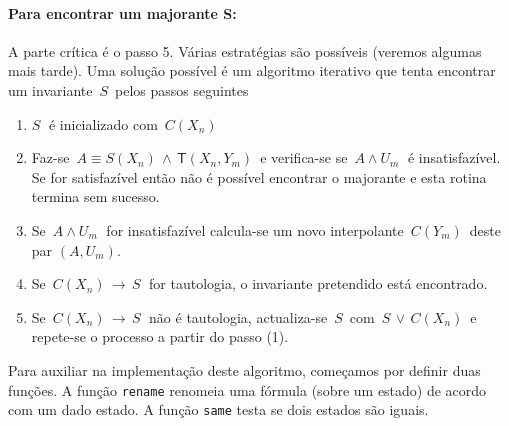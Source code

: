 \documentclass[11pt]{article}
\providecommand{\tightlist}{%
      \setlength{\itemsep}{0pt}\setlength{\parskip}{0pt}}
\begin{document}
\hypertarget{para-encontrar-um-majorante-s}{%
\paragraph{\texorpdfstring{Para encontrar um majorante S:}{Para encontrar um majorante S:}}\label{para-encontrar-um-majorante-s}}

A parte crítica é o passo 5. Várias estratégias são possíveis (veremos
algumas mais tarde). Uma solução possível é um algoritmo iterativo que
tenta encontrar um invariante \(\,S\,\) pelos passos seguintes

\begin{enumerate}
\def\labelenumi{\arabic{enumi}.}
\tightlist
\item
  \(S\;\) é inicializado com \(\,C(X_n)\)
\item
  Faz-se \(\,A \equiv S(X_n)\,\land\,\mathsf{T}(X_n,Y_m)\,\) e
  verifica-se se \(\,A\land U_m\;\) é insatisfazível. Se for
  satisfazível então não é possível encontrar o majorante e esta rotina
  termina sem sucesso.
\item
  Se \(\,A \land U_m\;\) for insatisfazível calcula-se um novo
  interpolante \(\,C(Y_m)\,\) deste par \((A,U_m)\).
\item
  Se \(\,C(X_n)\,\to\,S\;\) for tautologia, o invariante pretendido está
  encontrado.
\item
  Se \(\,C(X_n)\,\to\,S\;\) não é tautologia, actualiza-se \(\,S\,\) com
  \(\,S \,\lor\, C(X_n)\,\) e repete-se o processo a partir do passo
  (1).
\end{enumerate}

Para auxiliar na implementação deste algoritmo, começamos por definir
duas funções. A função \texttt{rename} renomeia uma fórmula (sobre um
estado) de acordo com um dado estado. A função \texttt{same} testa se
dois estados são iguais.
\end{document}
